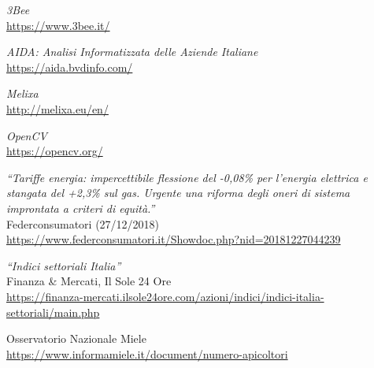 \newpage
\begin{thebibliography}{99}


\emph{3Bee} \\
\url{https://www.3bee.it/
}

\emph{AIDA: Analisi Informatizzata delle Aziende Italiane} \\
\url{https://aida.bvdinfo.com/}

\emph{Melixa} \\
\url{http://melixa.eu/en/}

\emph{OpenCV} \\
\url{https://opencv.org/}

\emph{``Tariffe energia: impercettibile flessione del -0,08\% per l’energia
elettrica e stangata del +2,3\% sul gas. Urgente una riforma degli oneri di
sistema improntata a criteri di equità.''} \\
Federconsumatori (27/12/2018) \\
\url{https://www.federconsumatori.it/Showdoc.php?nid=20181227044239}

\emph{``Indici settoriali Italia''} \\
Finanza \& Mercati, Il Sole 24 Ore \\
\url{https://finanza-mercati.ilsole24ore.com/azioni/indici/indici-italia-settoriali/main.php}

Osservatorio Nazionale Miele \\
\url{https://www.informamiele.it/document/numero-apicoltori}
\end{thebibliography}
